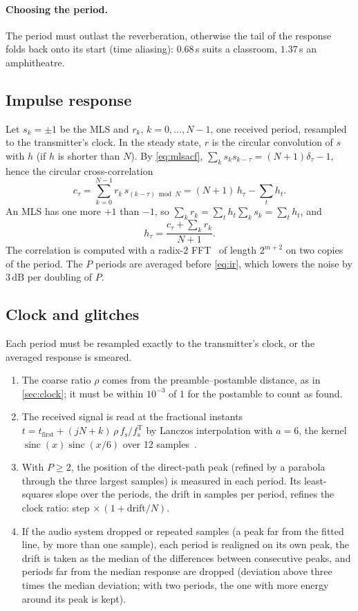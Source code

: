 \documentclass[11pt,a4paper]{article}
\newcommand{\dB}{\,\mathrm{dB}}
\newcommand{\fsT}{f_{\mathrm{s}}^{\mathrm{T}}}
\newcommand{\fs}{f_{\mathrm{s}}}
\theoremstyle{remark}
\begin{document}
\paragraph{Choosing the period.}
The period must outlast the reverberation, otherwise the tail of the response folds back onto its start (time aliasing): $0.68$\,s suits a classroom, $1.37$\,s an amphitheatre.

\subsection{Impulse response}
Let $s_k = \pm 1$ be the MLS and $r_k$, $k = 0, \dots, N-1$, one received period, resampled to the transmitter's clock. In the steady state, $r$ is the circular convolution of $s$ with $h$ (if $h$ is shorter than $N$). By \cref{eq:mlsacf}, $\sum_k s_k s_{k-\tau} = (N+1)\delta_\tau - 1$, hence the circular cross-correlation
\begin{equation}
c_\tau = \sum_{k=0}^{N-1} r_k\, s_{(k-\tau) \bmod N} = (N+1)\, h_\tau - \sum_t h_t .
\end{equation}
An MLS has one more $+1$ than $-1$, so $\sum_k r_k = \sum_t h_t \sum_k s_k = \sum_t h_t$, and
\begin{equation}
h_\tau = \frac{c_\tau + \sum_k r_k}{N + 1} .
\label{eq:ir}
\end{equation}
The correlation is computed with a radix-2 FFT~\cite{cooleytukey} of length $2^{m+2}$ on two copies of the period. The $P$ periods are averaged before \cref{eq:ir}, which lowers the noise by $3\dB$ per doubling of $P$.

\subsection{Clock and glitches}
Each period must be resampled exactly to the transmitter's clock, or the averaged response is smeared.
\begin{enumerate}
\item The coarse ratio $\rho$ comes from the preamble--postamble distance, as in \cref{sec:clock}; it must be within $10^{-3}$ of 1 for the postamble to count as found.
\item The received signal is read at the fractional instants $t = t_{\text{first}} + (jN + k)\,\rho\,\fs/\fsT$ by Lanczos interpolation with $a = 6$, the kernel $\operatorname{sinc}(x)\operatorname{sinc}(x/6)$ over 12 samples~\cite{duchon}.
\item With $P \ge 2$, the position of the direct-path peak (refined by a parabola through the three largest samples) is measured in each period. Its least-squares slope over the periods, the drift in samples per period, refines the clock ratio: step $\times\,(1 + \text{drift}/N)$.
\item If the audio system dropped or repeated samples (a peak far from the fitted line, by more than one sample), each period is realigned on its own peak, the drift is taken as the median of the differences between consecutive peaks, and periods far from the median response are dropped (deviation above three times the median deviation; with two periods, the one with more energy around its peak is kept).
\end{enumerate}
\end{document}
